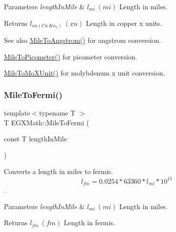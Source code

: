 \begin{DoxyParams}{Parameters}
{\em length\+In\+Mile} & $ l_{mi}\ (mi)$ Length in miles. \\
\hline
\end{DoxyParams}
\begin{DoxyReturn}{Returns}
$ l_{xu(Cu\ K\alpha_1)}\ (xu)$ Length in copper x units. 
\end{DoxyReturn}
\begin{DoxySeeAlso}{See also}
\mbox{\hyperlink{group___e_g_x_math-_conversions-_length_conversions-_imperial-_mile-_non-_s_i_ga291d6035f59be619459011941676f7c7}{Mile\+To\+Angstrom()}} for angstrom conversion. 

\mbox{\hyperlink{group___e_g_x_math-_conversions-_length_conversions-_imperial-_mile-_s_i_ga470a1271de988c28cb4851e5930d99da}{Mile\+To\+Picometer()}} for picometer conversion. 

\mbox{\hyperlink{group___e_g_x_math-_conversions-_length_conversions-_imperial-_mile-_non-_s_i_gadefb09bf42157adb9c7a458b93e3a851}{Mile\+To\+Mo\+X\+Unit()}} for molybdenum x unit conversion. 
\end{DoxySeeAlso}
\mbox{\label{group___e_g_x_math-_conversions-_length_conversions-_imperial-_mile-_non-_s_i_gaf09d006cf827d210a8506e1add02cb0b}} 
\subsubsection{\texorpdfstring{Mile\+To\+Fermi()}{MileToFermi()}}
{\footnotesize\ttfamily template$<$typename T $>$ \\
T E\+G\+X\+Math\+::\+Mile\+To\+Fermi (\begin{DoxyParamCaption}\item[{const T}]{length\+In\+Mile }\end{DoxyParamCaption})}



Converts a length in miles to fermis. \[ l_{fm}=0.0254 * 63360 * l_{mi} * 10^{15} \]. 


\begin{DoxyParams}{Parameters}
{\em length\+In\+Mile} & $ l_{mi}\ (mi)$ Length in miles. \\
\hline
\end{DoxyParams}
\begin{DoxyReturn}{Returns}
$ l_{fm}\ (fm)$ Length in fermis. 
\end{DoxyReturn}
\mbox{\label{group___e_g_x_math-_conversions-_length_conversions-_imperial-_mile-_non-_s_i_ga0ab31c74561b6127ec6639c17c5c94e5}} 
